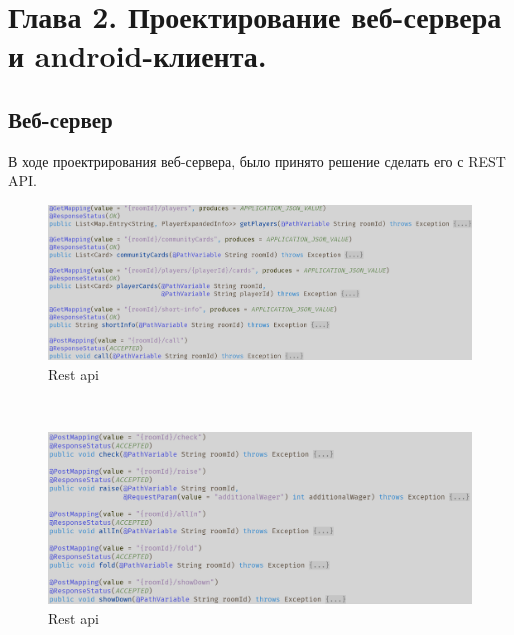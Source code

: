 \section*{Глава 2. Проектирование веб-сервера и android-клиента.}


\subsection*{Веб-сервер}

В ходе проектрирования веб-сервера, было принято решение сделать его с REST API.

\begin{figure}[H]
	\begin{center}
		\includegraphics[scale=0.6]{pics/rest1}
	    \caption{Rest api} 
		\label{pic:rest:1}
	\end{center}
\end{figure}

~

\begin{figure}[H]
	\begin{center}
		\includegraphics[scale=0.6]{pics/rest2}
	    \caption{Rest api} 
		\label{pic:rest:2}
	\end{center}
\end{figure}

